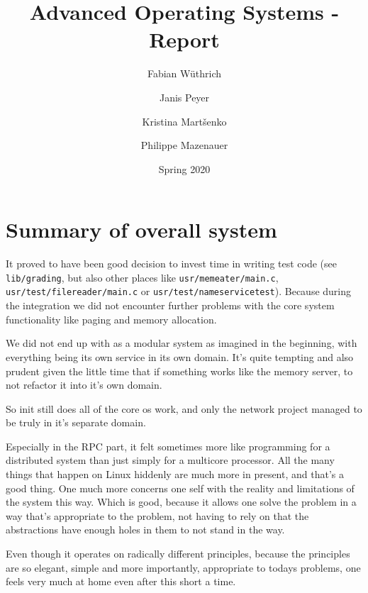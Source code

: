 \documentclass[11pt,a4paper]{report}
\begin{document}
\title{Advanced Operating Systems - Report}
\author{
Fabian W{\" u}thrich
\and
Janis Peyer 
\and
Kristina Mart{\v s}enko
\and
Philippe Mazenauer
}
\date{Spring 2020}

\maketitle

\tableofcontents

\listoffigures

\clearpage























\chapter{Summary of overall system}

It proved to have been good decision to invest time in writing test code
(see \verb|lib/grading|, but also other places like \verb|usr/memeater/main.c|, \newline
\verb|usr/test/filereader/main.c| or \verb|usr/test/nameservicetest|).
Because during the integration we did not encounter further problems with the
core system functionality like paging and memory allocation.

We did not end up with as a modular system as imagined in the beginning, with
everything being its own service in its own domain.
It's quite tempting and also prudent given the little time that if something
works like the memory server, to not refactor it into it's own domain.

So init still does all of the core os work, and only the network project managed
to be truly in it's separate domain.

Especially in the RPC part, it felt sometimes more like programming for a
distributed system than just simply for a multicore processor.
All the many things that happen on Linux hiddenly are much more in present, and
that's a good thing.
One much more concerns one self with the reality and limitations of the system
this way.
Which is good, because it allows one solve the problem in a way that's
appropriate to the problem, not having to rely on that the abstractions have
enough holes in them to not stand in the way.

Even though it operates on radically different principles, because the
principles are so elegant, simple and more importantly, appropriate to todays
problems, one feels very much at home even after this short a time.

\appendix



\end{document}
